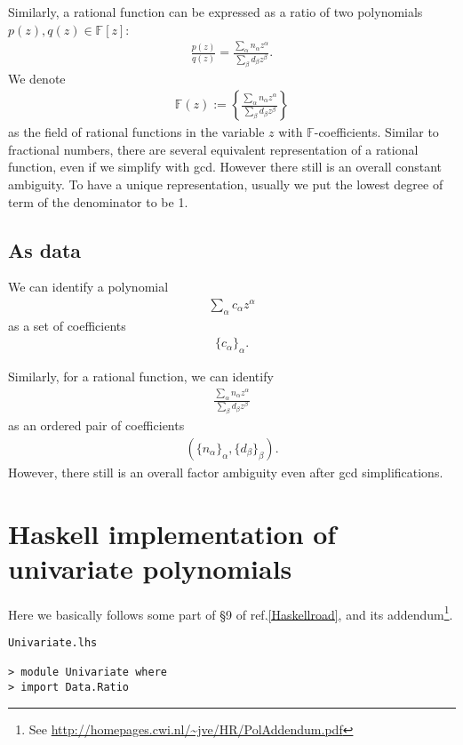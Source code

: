 \documentclass[11pt]{book}
\begin{document}
Similarly, a rational function can be expressed as a ratio of two polynomials $p(z),q(z) \in \mathbb{F}[z]$:
\begin{eqnarray}
\frac{p(z)}{q(z)} = \frac{\sum_\alpha n_\alpha z^\alpha}{\sum_\beta d_\beta z^\beta}.
\end{eqnarray}
We denote
\begin{eqnarray}
\mathbb{F}(z) := \left\{ \frac{\sum_\alpha n_\alpha z^\alpha}{\sum_\beta d_\beta z^\beta} \right\}
\end{eqnarray}
as the field of rational functions in the variable $z$ with $\mathbb{F}$-coefficients.
Similar to fractional numbers, there are several equivalent representation of a rational function, even if we simplify with gcd.
However there still is an overall constant ambiguity.
To have a unique representation, usually we put the lowest degree of term of the denominator to be 1.

\subsection{As data}
We can identify a polynomial
\begin{eqnarray}
\sum_\alpha c_\alpha z^\alpha
\end{eqnarray}
as a set of coefficients
\begin{eqnarray}
\{ c_\alpha\}_{\alpha}.
\end{eqnarray}

Similarly, for a rational function, we can identify
\begin{eqnarray}
\frac{\sum_\alpha n_\alpha z^\alpha}{\sum_\beta d_\beta z^\beta}
\end{eqnarray}
as an ordered pair of coefficients
\begin{eqnarray}
(\{ n_\alpha\}_\alpha, \{ d_\beta\}_\beta).
\end{eqnarray}
However, there still is an overall factor ambiguity even after gcd simplifications.

\section{Haskell implementation of univariate polynomials}
Here we basically follows some part of \S9 of ref.\ref{Haskellroad}, and its addendum\footnote{
See \url{http://homepages.cwi.nl/~jve/HR/PolAddendum.pdf}
}.

\begin{verbatim}
Univariate.lhs

> module Univariate where
> import Data.Ratio
\end{verbatim}
\end{document}
